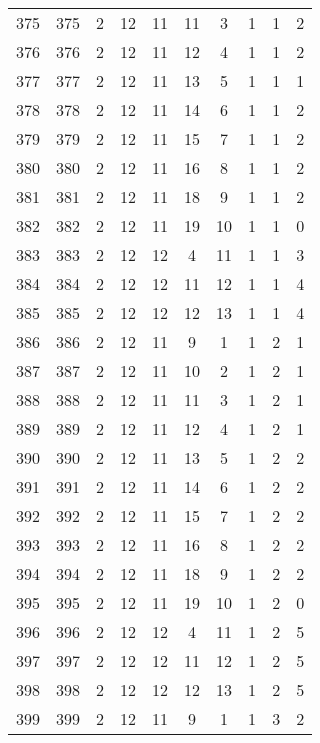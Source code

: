 \begin{longtable}{cccccccccc}
  375 & 375 &   2 &  12 &  11 &  11 &   3 &   1 &   1 &   2 \\ 
  376 & 376 &   2 &  12 &  11 &  12 &   4 &   1 &   1 &   2 \\ 
  377 & 377 &   2 &  12 &  11 &  13 &   5 &   1 &   1 &   1 \\ 
  378 & 378 &   2 &  12 &  11 &  14 &   6 &   1 &   1 &   2 \\ 
  379 & 379 &   2 &  12 &  11 &  15 &   7 &   1 &   1 &   2 \\ 
  380 & 380 &   2 &  12 &  11 &  16 &   8 &   1 &   1 &   2 \\ 
  381 & 381 &   2 &  12 &  11 &  18 &   9 &   1 &   1 &   2 \\ 
  382 & 382 &   2 &  12 &  11 &  19 &  10 &   1 &   1 &   0 \\ 
  383 & 383 &   2 &  12 &  12 &   4 &  11 &   1 &   1 &   3 \\ 
  384 & 384 &   2 &  12 &  12 &  11 &  12 &   1 &   1 &   4 \\ 
  385 & 385 &   2 &  12 &  12 &  12 &  13 &   1 &   1 &   4 \\ 
  386 & 386 &   2 &  12 &  11 &   9 &   1 &   1 &   2 &   1 \\ 
  387 & 387 &   2 &  12 &  11 &  10 &   2 &   1 &   2 &   1 \\ 
  388 & 388 &   2 &  12 &  11 &  11 &   3 &   1 &   2 &   1 \\ 
  389 & 389 &   2 &  12 &  11 &  12 &   4 &   1 &   2 &   1 \\ 
  390 & 390 &   2 &  12 &  11 &  13 &   5 &   1 &   2 &   2 \\ 
  391 & 391 &   2 &  12 &  11 &  14 &   6 &   1 &   2 &   2 \\ 
  392 & 392 &   2 &  12 &  11 &  15 &   7 &   1 &   2 &   2 \\ 
  393 & 393 &   2 &  12 &  11 &  16 &   8 &   1 &   2 &   2 \\ 
  394 & 394 &   2 &  12 &  11 &  18 &   9 &   1 &   2 &   2 \\ 
  395 & 395 &   2 &  12 &  11 &  19 &  10 &   1 &   2 &   0 \\ 
  396 & 396 &   2 &  12 &  12 &   4 &  11 &   1 &   2 &   5 \\ 
  397 & 397 &   2 &  12 &  12 &  11 &  12 &   1 &   2 &   5 \\ 
  398 & 398 &   2 &  12 &  12 &  12 &  13 &   1 &   2 &   5 \\ 
  399 & 399 &   2 &  12 &  11 &   9 &   1 &   1 &   3 &   2 \\ 

\end{longtable}
